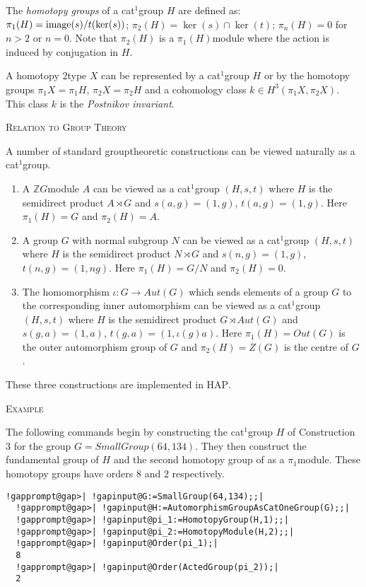 \documentclass[a4paper,11pt]{report}
\begin{document}
{{The \emph{homotopy groups} of a cat$^1$\texttt{}group $H$ are defined as: $\pi_1(H) = {\rm image}(s)/t(\ker(s))$; $\pi_2(H)=\ker(s) \cap \ker(t)$; $\pi_n(H)=0$ for $n> 2$ or $n=0$. Note that $\pi_2(H)$ is a $\pi_1(H)$\texttt{}module where the action is induced by conjugation in $H$. 

A homotopy $2$\texttt{}type $X$ can be represented by a cat$^1$\texttt{}group $H$ or by the homotopy groups $\pi_1X=\pi_1H$, $\pi_2X=\pi_2H$ and a cohomology class $k\in H^3(\pi_1X,\pi_2X)$. This class $k$ is the \emph{Postnikov invariant}. 

\textsc{Relation to Group Theory} 

A number of standard group\texttt{}theoretic constructions can be
viewed naturally as a cat$^1$\texttt{}group. 
\begin{enumerate}
\item  A $\mathbb ZG$\texttt{}module $A$ can be viewed as a cat$^1$\texttt{}group $(H,s,t)$ where $H$ is the semi\texttt{}direct product $A\rtimes G$ and $s(a,g)=(1,g)$, $t(a,g)=(1,g)$. Here $\pi_1(H)=G$ and $\pi_2(H)=A$.
\item  A group $G$ with normal subgroup $N$ can be viewed as a cat$^1$\texttt{}group $(H,s,t)$ where $H$ is the semi\texttt{}direct product $N\rtimes G$ and $s(n,g)=(1,g)$, $t(n,g)=(1,ng)$. Here $\pi_1(H)=G/N$ and $\pi_2(H)=0$.
\item  The homomorphism $\iota \colon G\rightarrow Aut(G)$ which sends elements of a group $G$ to the corresponding inner automorphism can be viewed as a cat$^1$\texttt{}group $(H,s,t)$ where $H$ is the semi\texttt{}direct product $G\rtimes Aut(G)$ and $s(g,a)=(1,a)$, $t(g,a)=(1,\iota (g)a)$. Here $\pi_1(H)=Out(G)$ is the outer automorphism group of $G$ and $\pi_2(H)=Z(G)$ is the centre of $G$.
\end{enumerate}
 These three constructions are implemented in \textsc{HAP}. 

\textsc{Example} 

The following commands begin by constructing the cat$^1$\texttt{}group $H$ of Construction 3 for the group $G=SmallGroup(64,134)$. They then construct the fundamental group of $H$ and the second homotopy group of as a $\pi_1$\texttt{}module. These homotopy groups have orders $8$ and $2$ respectively. 
\begin{Verbatim}[commandchars=!@|,fontsize=\small,frame=single,label=Example]
  !gapprompt@gap>| !gapinput@G:=SmallGroup(64,134);;|
  !gapprompt@gap>| !gapinput@H:=AutomorphismGroupAsCatOneGroup(G);;|
  !gapprompt@gap>| !gapinput@pi_1:=HomotopyGroup(H,1);;|
  !gapprompt@gap>| !gapinput@pi_2:=HomotopyModule(H,2);;|
  !gapprompt@gap>| !gapinput@Order(pi_1);|
  8
  !gapprompt@gap>| !gapinput@Order(ActedGroup(pi_2));|
  2
  

\end{Verbatim}}}
\end{document}
